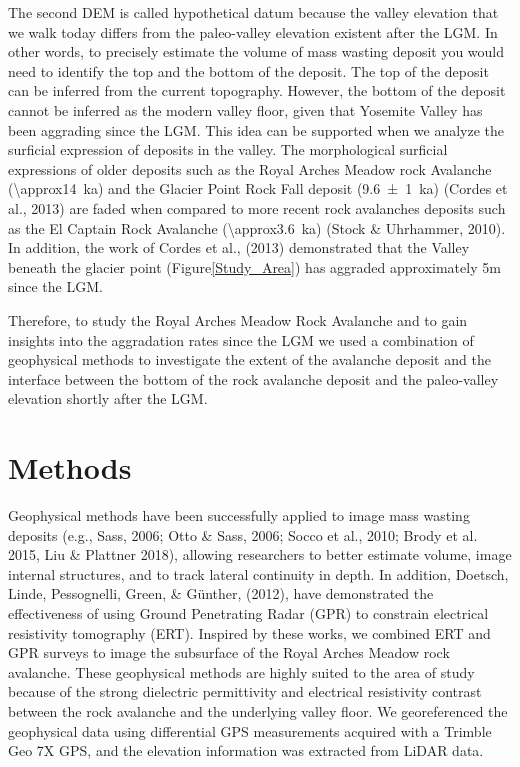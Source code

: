 \documentclass[5p]{elsarticle}
\begin{document}
The second DEM is called hypothetical datum because the valley elevation that we walk today differs from the paleo-valley elevation existent after the LGM. In other words, to precisely estimate the volume of mass wasting deposit you would need to identify the top and the bottom of the deposit. The top of the deposit can be inferred from the current topography. However, the bottom of the deposit cannot be inferred as the modern valley floor, given that Yosemite Valley has been aggrading since the LGM. This idea can be supported when we analyze the surficial expression of deposits in the valley. The morphological surficial expressions of older deposits such as the Royal Arches Meadow rock Avalanche (\SI{\approx14}{\kilo a}) and the Glacier Point Rock Fall deposit (\SI{9.6 \pm 1}{\kilo a}) (Cordes et al., 2013) are faded when compared to more recent rock avalanches deposits such as the El Captain Rock Avalanche (\SI{\approx3.6}{\kilo a}) (Stock \& Uhrhammer, 2010). In addition, the work of Cordes et al., (2013) demonstrated that the Valley beneath the glacier point (Figure\ref{Study_Area}) has aggraded approximately 5m since the LGM.

Therefore, to study the Royal Arches Meadow Rock Avalanche and to gain insights into the aggradation rates since the LGM we used a combination of geophysical methods to investigate the extent of the avalanche deposit and the interface between the bottom of the rock avalanche deposit and the paleo-valley elevation shortly after the LGM.





										\section{Methods}

Geophysical methods have been successfully applied to image mass wasting deposits  (e.g., Sass, 2006; Otto \& Sass, 2006; Socco et al., 2010; Brody et al. 2015, Liu \& Plattner 2018), allowing researchers to better estimate volume, image internal structures, and to track lateral continuity in depth. In addition, Doetsch, Linde, Pessognelli, Green, \& Günther, (2012), have demonstrated the effectiveness of using Ground Penetrating Radar (GPR) to constrain electrical resistivity tomography (ERT). Inspired by these works, we combined ERT and GPR surveys to image the subsurface of the Royal Arches Meadow rock avalanche. These geophysical methods are highly suited to the area of study because of the strong dielectric permittivity and electrical resistivity contrast between the rock avalanche and the underlying valley floor. We georeferenced the geophysical data using differential GPS measurements acquired with a Trimble Geo 7X GPS, and the elevation information was extracted from LiDAR data.
\end{document}
